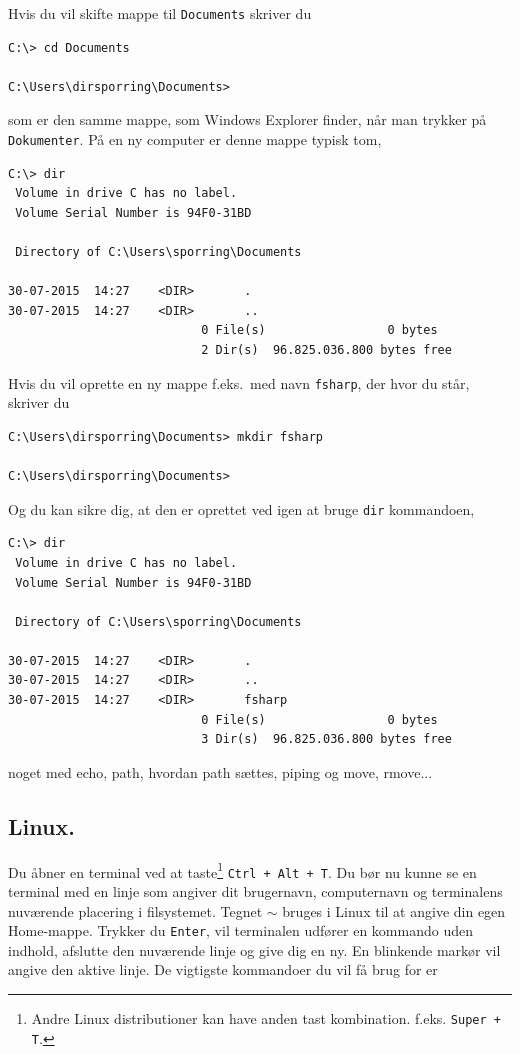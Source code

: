 \documentclass[a4paper]{article}
\begin{document}
Hvis du vil skifte mappe til \texttt{Documents} skriver du
\begin{lstlisting}[frame=single]
C:\> cd Documents

C:\Users\dirsporring\Documents>
\end{lstlisting}
som er den samme mappe, som Windows Explorer finder, når man trykker på \texttt{Dokumenter}. På en ny computer er denne mappe typisk tom,
\begin{lstlisting}[frame=single]
C:\> dir
 Volume in drive C has no label.
 Volume Serial Number is 94F0-31BD

 Directory of C:\Users\sporring\Documents

30-07-2015  14:27    <DIR>       .
30-07-2015  14:27    <DIR>       ..
                           0 File(s)                 0 bytes
                           2 Dir(s)  96.825.036.800 bytes free
\end{lstlisting}
Hvis du vil oprette en ny mappe f.eks.\ med navn \texttt{fsharp}, der hvor du står, skriver du
\begin{lstlisting}[frame=single]
C:\Users\dirsporring\Documents> mkdir fsharp

C:\Users\dirsporring\Documents>
\end{lstlisting}
Og du kan sikre dig, at den er oprettet ved igen at bruge \texttt{dir} kommandoen,
\begin{lstlisting}[frame=single]
C:\> dir
 Volume in drive C has no label.
 Volume Serial Number is 94F0-31BD

 Directory of C:\Users\sporring\Documents

30-07-2015  14:27    <DIR>       .
30-07-2015  14:27    <DIR>       ..
30-07-2015  14:27    <DIR>       fsharp
                           0 File(s)                 0 bytes
                           3 Dir(s)  96.825.036.800 bytes free
\end{lstlisting}

noget med echo, path, hvordan path sættes, piping og move, rmove...

\subsection{Linux.}

Du åbner en terminal ved at taste\footnote{Andre Linux distributioner kan have anden tast kombination. f.eks. \texttt{Super + T}.} \texttt{Ctrl + Alt + T}. Du bør nu kunne se en terminal med en linje som angiver dit brugernavn, computernavn og terminalens nuværende placering i filsystemet. Tegnet $\sim$ bruges i Linux til at angive din egen Home-mappe. Trykker du \texttt{Enter}, vil terminalen udfører en kommando uden indhold, afslutte den nuværende linje og give dig en ny. En blinkende markør vil angive den aktive linje. De vigtigste kommandoer du vil få brug for er
\end{document}
